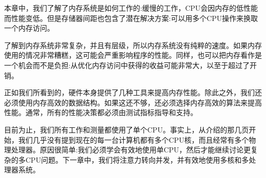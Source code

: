 本章中，我们了解了内存系统是如何工作的:缓慢的工作，CPU会因内存的低性能而性能变低。但是存储器间距也包含了潜在解决方案:可以用多个CPU操作来换取一个内存访问。

了解到内存系统非常复杂，并且有层级，所以内存系统没有纯粹的速度。如果内存使用的情况非常糟糕，这可能会严重影响程序的性能。同样，也可以把内存看作是一个机会而不是负担:从优化内存访问中获得的收益可能非常大，以至于超过了开销。

正如我们所看到的，硬件本身提供了几种工具来提高内存性能。除此之外，我们还必须使用内存高效的数据结构。如果这还不够，还必须选择内存高效的算法来提高性能。通常，所有的性能决策都必须由测试指标指导和支持。

目前为止，我们所有工作和测量都使用了单个CPU。事实上，从介绍的那几页开始，我们几乎没有提到现在的每一台计算机都有多个CPU核，而且经常有多个物理处理器。原因很简单:我们必须学会有效地使用单CPU，然后才能继续讨论更复杂的多CPU问题。下一章中，我们将注意力转向并发，并有效地使用多核和多处理器系统。